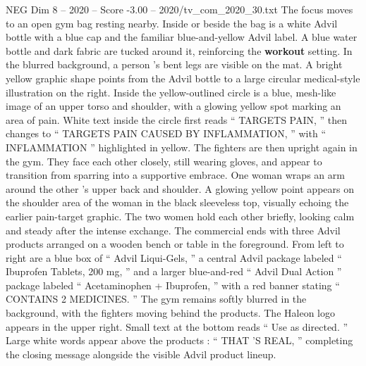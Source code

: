\begin{textsample}{NEG Dim 8 – 2020 – Score -3.00 – 2020/tv\_com\_2020\_30.txt}
The focus moves to an open gym bag resting nearby.
Inside or beside the bag is a white Advil bottle with a blue cap and the familiar blue-and-yellow Advil label.
A blue water bottle and dark fabric are tucked around it, reinforcing the \textbf{workout} setting.
In the blurred background, a person ’s bent legs are visible on the mat.
A bright yellow graphic shape points from the Advil bottle to a large circular medical-style illustration on the right.
Inside the yellow-outlined circle is a blue, mesh-like image of an upper torso and shoulder, with a glowing yellow spot marking an area of pain.
White text inside the circle first reads “ TARGETS PAIN, ” then changes to “ TARGETS PAIN CAUSED BY INFLAMMATION, ” with “ INFLAMMATION ” highlighted in yellow.
The fighters are then upright again in the gym.
They face each other closely, still wearing gloves, and appear to transition from sparring into a supportive embrace.
One woman wraps an arm around the other ’s upper back and shoulder.
A glowing yellow point appears on the shoulder area of the woman in the black sleeveless top, visually echoing the earlier pain-target graphic.
The two women hold each other briefly, looking calm and steady after the intense exchange.
The commercial ends with three Advil products arranged on a wooden bench or table in the foreground.
From left to right are a blue box of “ Advil Liqui-Gels, ” a central Advil package labeled “ Ibuprofen Tablets, 200 mg, ” and a larger blue-and-red “ Advil Dual Action ” package labeled “ Acetaminophen + Ibuprofen, ” with a red banner stating “ CONTAINS 2 MEDICINES. ” The gym remains softly blurred in the background, with the fighters moving behind the products.
The Haleon logo appears in the upper right.
Small text at the bottom reads “ Use as directed. ” Large white words appear above the products : “ THAT ’S REAL, ” completing the closing message alongside the visible Advil product lineup.

\end{textsample}
